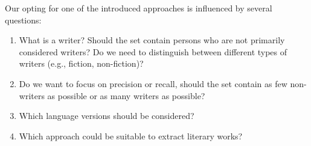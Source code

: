 \documentclass[a4paper,12pt]{scrartcl}
\begin{document}
Our opting for one of the introduced approaches is influenced by
several questions:
%
\begin{enumerate}[1.] %
\item What is a writer? Should the set contain persons who are not
  primarily considered writers? Do we need to
  distinguish between different types of writers (e.g., fiction,
  non-fiction)? %
\item Do we want to focus on precision or recall, \ie should the
  set contain as few non-writers as possible or as many writers as
  possible?
\item Which language versions should be considered?
\item Which approach could be suitable to extract literary works?
\end{enumerate}

%
\end{document}
